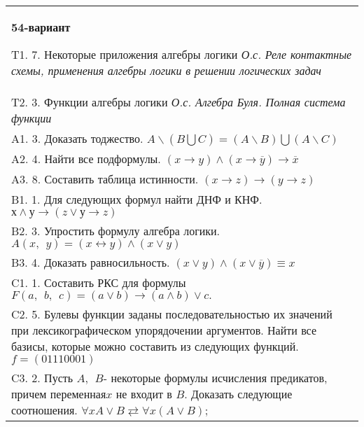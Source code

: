 \documentclass{article}
\begin{document}
\begin{tabular}{m{17cm}}
\textbf{54-вариант}
\newline

T1. 7. Некоторые приложения алгебры логики \emph{О.с. Реле контактные схемы, применения алгебры логики в решении логических задач} \\
T2. 3. Функции алгебры логики \emph{О.с. Алгебра Буля. Полная система функции} \\
A1. 3. Доказать тоджество. \(A\backslash(B\bigcup C) = (A\backslash B)\bigcup(A\backslash C)\) \\
A2. 4. Найти все подформулы. \((x \rightarrow y) \land (x \rightarrow \overline{y}) \rightarrow \overline{x}\) \\
A3. 8. Составить таблица истинности. \((x \rightarrow z) \rightarrow (y \rightarrow z)\) \\
B1. 1. Для следующих формул найти ДНФ и КНФ. \(х \land у \rightarrow (z \vee у \rightarrow z)\) \\
B2. 3. Упростить формулу алгебра логики. \(A(x,\ \ y) = (x \leftrightarrow y) \land (x \vee y)\) \\
B3. 4. Доказать равносильность. \((x \vee y) \land (x \vee \overline{y}) \equiv x\) \\
C1. 1. Составить РКС для формулы \(F(a,\ \ b,\ \ c) = (a \vee b) \rightarrow (a \land b) \vee c.\) \\
C2. 5. Булевы функции заданы последовательностью их значений при лексикографическом упорядочении аргументов. Найти все базисы, которые можно составить из следующих функций. \(f = (01110001)\) \\
C3. 2. Пусть \(A,\ \ B\)- некоторые формулы исчисления предикатов, причем переменная\(x\) не входит в \(B\). Доказать следующие соотношения. \(\forall xA \vee B \rightleftarrows \forall x(A \vee B)\); \\

\end{tabular}
\vspace{1cm}
\end{document}
